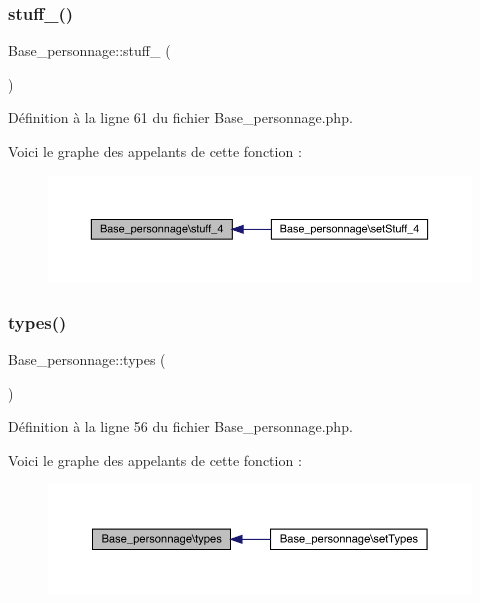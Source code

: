 \subsubsection{\texorpdfstring{stuff\+\_()}{stuff\_4()}}
{\footnotesize\ttfamily Base\+\_\+personnage\+::stuff\+\_ (\begin{DoxyParamCaption}{ }\end{DoxyParamCaption})}



Définition à la ligne 61 du fichier Base\+\_\+personnage.\+php.

Voici le graphe des appelants de cette fonction \+:\nopagebreak
\begin{figure}[H]
\begin{center}
\leavevmode
\includegraphics[width=350pt]{class_base__personnage_afb797796a81d9bec991ede838c711bd6_icgraph}
\end{center}
\end{figure}
\mbox{\label{class_base__personnage_a24e406f1e1d2c35596ccd5a6627c5650}} 
\subsubsection{\texorpdfstring{types()}{types()}}
{\footnotesize\ttfamily Base\+\_\+personnage\+::types (\begin{DoxyParamCaption}{ }\end{DoxyParamCaption})}



Définition à la ligne 56 du fichier Base\+\_\+personnage.\+php.

Voici le graphe des appelants de cette fonction \+:\nopagebreak
\begin{figure}[H]
\begin{center}
\leavevmode
\includegraphics[width=350pt]{class_base__personnage_a24e406f1e1d2c35596ccd5a6627c5650_icgraph}
\end{center}
\end{figure}


